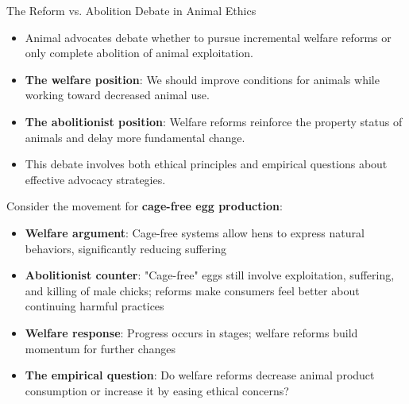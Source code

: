 \documentclass{beamer}
\begin{document}
	\begin{frame}{The Reform vs. Abolition Debate in Animal Ethics}
		\begin{itemize}
			\item Animal advocates debate whether to pursue incremental welfare reforms or only complete abolition of animal exploitation.
			\item \textbf{The welfare position}: We should improve conditions for animals while working toward decreased animal use.
			\item \textbf{The abolitionist position}: Welfare reforms reinforce the property status of animals and delay more fundamental change.
			\item This debate involves both ethical principles and empirical questions about effective advocacy strategies.
		\end{itemize}
		
		\begin{example}
			\scriptsize
			Consider the movement for \textbf{cage-free egg production}:
			\begin{itemize}
				\item \textbf{Welfare argument}: Cage-free systems allow hens to express natural behaviors, significantly reducing suffering
				\item \textbf{Abolitionist counter}: "Cage-free" eggs still involve exploitation, suffering, and killing of male chicks; reforms make consumers feel better about continuing harmful practices
				\item \textbf{Welfare response}: Progress occurs in stages; welfare reforms build momentum for further changes
				\item \textbf{The empirical question}: Do welfare reforms decrease animal product consumption or increase it by easing ethical concerns?
			\end{itemize}
		\end{example}
	\end{frame}
	
\end{document}
